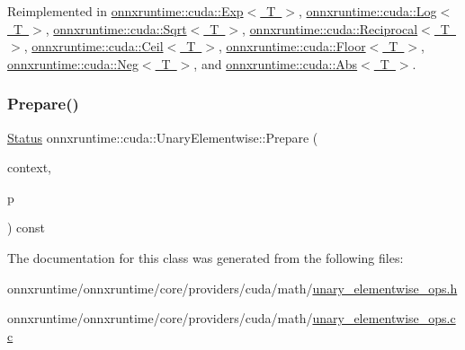 Reimplemented in \mbox{\hyperlink{classonnxruntime_1_1cuda_1_1Exp_a311efdccc5969833cb43fa07058186d0}{onnxruntime\+::cuda\+::\+Exp$<$ T $>$}}, \mbox{\hyperlink{classonnxruntime_1_1cuda_1_1Log_a857314aeb210d599f086e8109e6324d4}{onnxruntime\+::cuda\+::\+Log$<$ T $>$}}, \mbox{\hyperlink{classonnxruntime_1_1cuda_1_1Sqrt_a8bc2beeaa3b9aecd40e1ad87a118b723}{onnxruntime\+::cuda\+::\+Sqrt$<$ T $>$}}, \mbox{\hyperlink{classonnxruntime_1_1cuda_1_1Reciprocal_aa4aef164f01dedd8969d326ab2f37a0d}{onnxruntime\+::cuda\+::\+Reciprocal$<$ T $>$}}, \mbox{\hyperlink{classonnxruntime_1_1cuda_1_1Ceil_a9126a17817969afaf0c4bcf827907782}{onnxruntime\+::cuda\+::\+Ceil$<$ T $>$}}, \mbox{\hyperlink{classonnxruntime_1_1cuda_1_1Floor_ad9062f3bb265d435c16206fa28ba4f4f}{onnxruntime\+::cuda\+::\+Floor$<$ T $>$}}, \mbox{\hyperlink{classonnxruntime_1_1cuda_1_1Neg_a7ff46cf8e38f3a9e57a428d33ef00e9e}{onnxruntime\+::cuda\+::\+Neg$<$ T $>$}}, and \mbox{\hyperlink{classonnxruntime_1_1cuda_1_1Abs_a1bf2979c1a4933cd6155c2952c1dc772}{onnxruntime\+::cuda\+::\+Abs$<$ T $>$}}.

\mbox{\label{classonnxruntime_1_1cuda_1_1UnaryElementwise_a4309faae3b11787992d9a2c47c225f95}} 
\subsubsection{\texorpdfstring{Prepare()}{Prepare()}}
{\footnotesize\ttfamily \mbox{\hyperlink{classonnxruntime_1_1common_1_1Status}{Status}} onnxruntime\+::cuda\+::\+Unary\+Elementwise\+::\+Prepare (\begin{DoxyParamCaption}\item[{\mbox{\hyperlink{classonnxruntime_1_1OpKernelContext}{Op\+Kernel\+Context}} $\ast$}]{context,  }\item[{\mbox{\hyperlink{structonnxruntime_1_1cuda_1_1UnaryElementwisePreparation}{Unary\+Elementwise\+Preparation}} $\ast$}]{p }\end{DoxyParamCaption}) const\hspace{0.3cm}{\ttfamily [protected]}}



The documentation for this class was generated from the following files\+:\begin{DoxyCompactItemize}
\item 
onnxruntime/onnxruntime/core/providers/cuda/math/\mbox{\hyperlink{unary__elementwise__ops_8h}{unary\+\_\+elementwise\+\_\+ops.\+h}}\item 
onnxruntime/onnxruntime/core/providers/cuda/math/\mbox{\hyperlink{unary__elementwise__ops_8cc}{unary\+\_\+elementwise\+\_\+ops.\+cc}}\end{DoxyCompactItemize}
